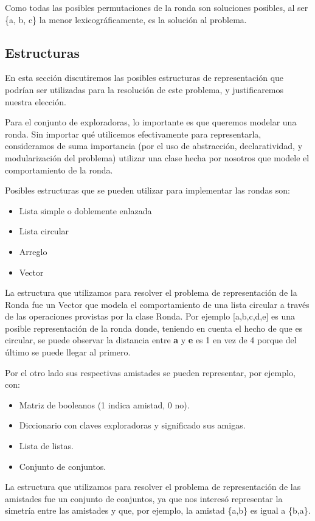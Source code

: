 \documentclass[11pt]{article}
\begin{document}
Como todas las posibles permutaciones de la ronda son soluciones posibles, al ser \{a, b, c\} la menor lexicográficamente, 
es la solución al problema.

\subsection{Estructuras}

En esta sección discutiremos las posibles estructuras de representación que podrían ser utilizadas
para la resolución de este problema, y justificaremos nuestra elección.

Para el conjunto de exploradoras, lo importante es que queremos modelar una ronda. Sin importar
qué utilicemos efectivamente para representarla, consideramos de suma importancia (por el uso de abstracción,
declaratividad, y modularización del problema) utilizar una clase hecha por nosotros que modele el 
comportamiento de la ronda.

Posibles estructuras que se pueden utilizar para implementar las rondas son: 
\begin{itemize}
\item Lista simple o doblemente enlazada
\item Lista circular
\item Arreglo
\item Vector
\end{itemize}
La estructura que utilizamos para resolver el problema de representación de la Ronda 
fue un Vector que modela el comportamiento de una 
lista circular a través de las operaciones provistas por la clase Ronda. Por ejemplo [a,b,c,d,e] es una 
posible representación de la ronda donde, teniendo en cuenta el hecho de que es circular,
se puede observar la distancia entre \textbf{a} y \textbf{e} es 1 en vez de 4 porque del último se puede llegar al primero.

Por el otro lado sus respectivas amistades se pueden representar, por ejemplo, con:
\begin{itemize}
\item Matriz de booleanos (1 indica amistad, 0 no).
\item Diccionario con claves exploradoras y significado sus amigas.
\item Lista de listas.
\item Conjunto de conjuntos.
\end{itemize}
La estructura que utilizamos para resolver el problema de representación de las amistades fue un conjunto de
conjuntos, ya que nos interesó representar la simetría entre las amistades y que, por ejemplo, la amistad 
\{a,b\} es igual a \{b,a\}.
\end{document}
